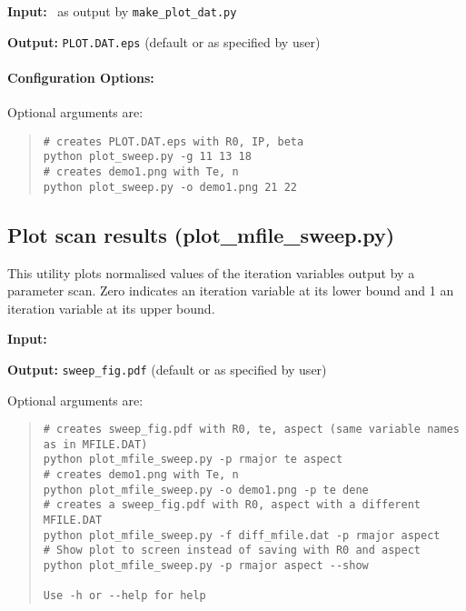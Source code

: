 \begin{description}
\item{\textbf{Input:}}
 \plotdat\, as output by \texttt{make\_plot\_dat.py}
                                
\item{\textbf{Output:}}
\texttt{PLOT.DAT.eps} (default or as specified by user)
\end{description}

\paragraph{Configuration Options:}

Optional arguments are:
\begin{quote}
\begin{verbatim}
# creates PLOT.DAT.eps with R0, IP, beta
python plot_sweep.py -g 11 13 18 
# creates demo1.png with Te, n
python plot_sweep.py -o demo1.png 21 22
\end{verbatim}
\end{quote}

\subsection{Plot scan results (plot\_mfile\_sweep.py)}

This utility plots normalised values of the iteration variables output by a parameter scan. Zero indicates an iteration variable at its lower bound and 1 an iteration variable at its upper bound.

\begin{description}
\item{\textbf{Input:}}
 \mfile
                                
\item{\textbf{Output:}}
\texttt{sweep\_fig.pdf} (default or as specified by user)
\end{description}

Optional arguments are:
\begin{quote}
\begin{verbatim}
# creates sweep_fig.pdf with R0, te, aspect (same variable names as in MFILE.DAT)
python plot_mfile_sweep.py -p rmajor te aspect
# creates demo1.png with Te, n
python plot_mfile_sweep.py -o demo1.png -p te dene
# creates a sweep_fig.pdf with R0, aspect with a different MFILE.DAT
python plot_mfile_sweep.py -f diff_mfile.dat -p rmajor aspect
# Show plot to screen instead of saving with R0 and aspect
python plot_mfile_sweep.py -p rmajor aspect --show

Use -h or --help for help

\end{verbatim}
\end{quote}

